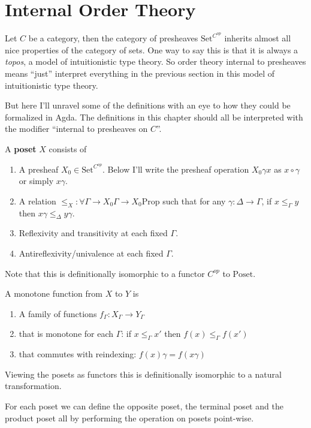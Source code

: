 \documentclass{article}
\newcommand{\Poset}{\textrm{Poset}}
\newcommand{\Set}{\textrm{Set}}
\newcommand{\Prop}{\textrm{Prop}}
\begin{document}
\section{Internal Order Theory}

Let $C$ be a category, then the category of presheaves $\Set^{C^{op}}$
inherits almost all nice properties of the category of sets. One way
to say this is that it is always a \emph{topos}, a model of
intuitionistic type theory. So order theory internal to presheaves
means ``just'' interpret everything in the previous section in this
model of intuitionistic type theory.

But here I'll unravel some of the definitions with an eye to how they
could be formalized in Agda. The definitions in this chapter should
all be interpreted with the modifier ``internal to presheaves on
$C$''.

A \textbf{poset} $X$ consists of
\begin{enumerate}
\item A presheaf $X_0 \in \Set^{C^{op}}$. Below I'll write the
  presheaf operation $X_0 \gamma x$ as $x \circ \gamma$ or simply
  $x\gamma$.
\item A relation $\leq_X : \forall \Gamma \to X_0 \Gamma \to X_0
  \Prop$ such that for any $\gamma : \Delta \to \Gamma$, if $x
  \leq_\Gamma y$ then $x\gamma \leq_\Delta y\gamma$.
\item Reflexivity and transitivity at each fixed $\Gamma$.
\item Antireflexivity/univalence at each fixed $\Gamma$.
\end{enumerate}
Note that this is definitionally isomorphic to a functor $C^{op}$ to
$\Poset$.

A monotone function from $X$ to $Y$ is
\begin{enumerate}
\item A family of functions $f_\Gamma : X_\Gamma \to Y_\Gamma$
\item that is monotone for each $\Gamma$: if $x \leq_\Gamma x'$ then $f(x) \leq_\Gamma f(x')$
\item that commutes with reindexing: $f(x)\gamma = f(x\gamma)$
\end{enumerate}
Viewing the posets as functors this is definitionally isomorphic to a
natural transformation.

For each poset we can define the opposite poset, the terminal poset
and the product poset all by performing the operation on posets
point-wise.
\end{document}
